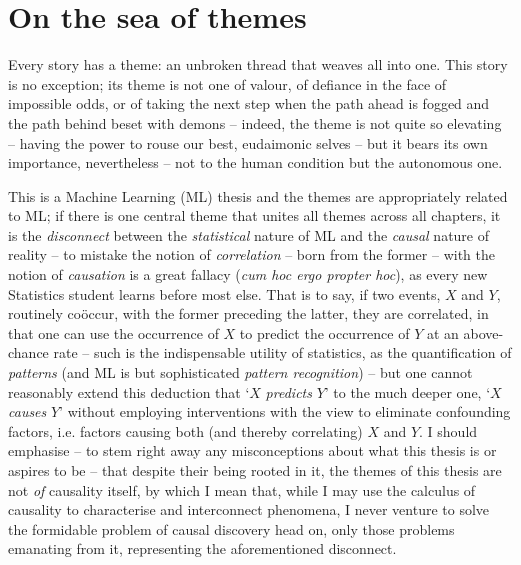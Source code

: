 \section{On the sea of themes}\label{sec:themes}
Every story has a theme:
an unbroken thread that weaves all into one.
%
This story is no exception; its theme is not one of valour, of defiance in the face of impossible
odds, or of taking the next step when the path ahead is fogged and the path behind beset with
demons -- indeed, the theme is not quite so elevating -- having the power to rouse our best,
eudaimonic selves -- but it bears its own importance, nevertheless -- not to the human condition
but the autonomous one.

%
%
This is a Machine Learning (ML) thesis and the themes are appropriately related to ML; if there
is one central theme that unites all themes across all chapters, it is the \emph{disconnect}
between the \emph{statistical} nature of ML and the \emph{causal} nature of reality -- to mistake
the notion of \emph{correlation} -- born from the former -- with the notion of \emph{causation} is
a great fallacy (\emph{cum hoc ergo propter hoc}), as every new Statistics student learns before
most else.
%
That is to say, if two events, \(X\) and \(Y\), routinely co{\"o}ccur, with the former preceding
the latter, they are correlated, in that one can use the occurrence of \(X\) to predict the
occurrence of \(Y\) at an above-chance rate -- such is the indispensable utility of statistics, as
the quantification of \emph{patterns} (and ML is but sophisticated \emph{pattern recognition}) --
but one cannot reasonably extend this deduction that `\(X\) \emph{predicts} \(Y\)' to the much
deeper one, `\(X\) \emph{causes} \(Y\)' without employing interventions with the view to eliminate
confounding factors, i.e. factors causing both (and thereby correlating) \(X\) and \(Y\).
%
I should emphasise -- to stem right away any misconceptions about what this thesis is or aspires to
be -- that despite their being rooted in it, the themes of this thesis are not \emph{of} causality
itself, by which I mean that, while I may use the calculus of causality to characterise and
interconnect phenomena, I never venture to solve the formidable problem of causal discovery head
on, only those problems emanating from it, representing the aforementioned disconnect.
%

